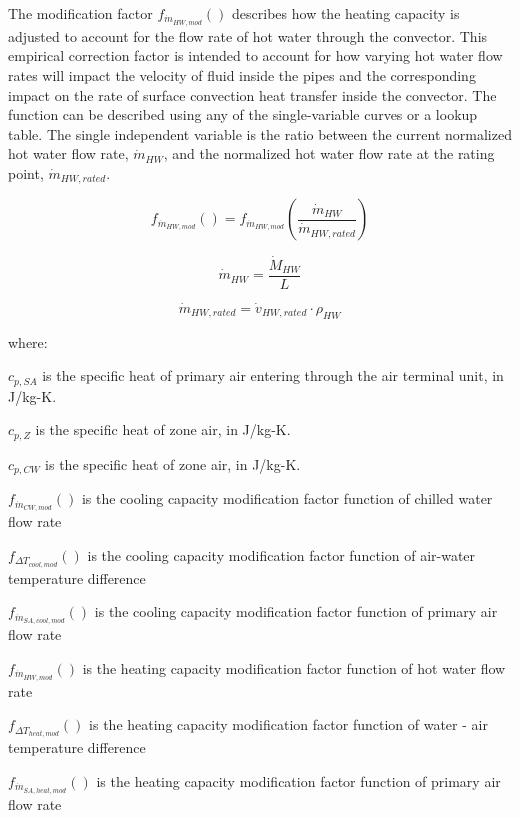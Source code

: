 The modification factor \(f_{\dot m_{HW,mod}}()\) describes how the heating capacity is adjusted to account for the flow rate of hot water through the convector. This empirical correction factor is intended to account for how varying hot water flow rates will impact the velocity of fluid inside the pipes and the corresponding impact on the rate of surface convection heat transfer inside the convector. The function can be described using any of the single-variable curves or a lookup table. The single independent variable is the ratio between the current normalized hot water flow rate, \({\dot m_{HW}}\), and the normalized hot water flow rate at the rating point, \({\dot m_{HW,rated}}\).

\begin{equation}
  f_{\dot m_{HW,mod}}() = f_{\dot m_{HW,mod}}\left(\frac{{\dot m_{HW}}}{{\dot m_{HW,rated}}}\right)
\end{equation}

\begin{equation}
  {\dot m_{HW}} = \frac{\dot M_{HW}}{L}
\end{equation}

\begin{equation}
  {\dot m_{HW,rated}} = {\dot v_{HW,rated}} \cdot {\rho_{HW}}
\end{equation} 

where:

\({c_{p,SA}}\) is the specific heat of primary air entering through the air terminal unit, in J/kg-K.

\({c_{p,Z}}\) is the specific heat of zone air, in J/kg-K.

\({c_{p,CW}}\) is the specific heat of zone air, in J/kg-K.

\({f_{\dot m_{CW,mod}}()}\) is the cooling capacity modification factor function of chilled water flow rate

\({f_{ \Delta T_{cool,mod} }()}\) is the cooling capacity modification factor function of air-water temperature difference

\({f_{\dot m_{SA,cool,mod}}()}\) is the cooling capacity modification factor function of primary air flow rate

\({f_{\dot m_{HW,mod}}()}\) is the heating capacity modification factor function of hot water flow rate

\({f_{ \Delta T_{heat,mod} }()}\) is the heating capacity modification factor function of water - air temperature difference

\({f_{\dot m_{SA,heat,mod}}()}\) is the heating capacity modification factor function of primary air flow rate

